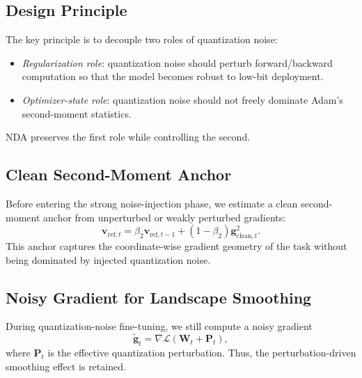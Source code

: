 \documentclass[journal]{IEEEtran}
\begin{document}
\subsection{Design Principle}
The key principle is to decouple two roles of quantization noise:
\begin{itemize}
    \item \emph{Regularization role}: quantization noise should perturb forward/backward computation so that the model becomes robust to low-bit deployment.
    \item \emph{Optimizer-state role}: quantization noise should not freely dominate Adam's second-moment statistics.
\end{itemize}
NDA preserves the first role while controlling the second.

\subsection{Clean Second-Moment Anchor}
Before entering the strong noise-injection phase, we estimate a clean second-moment anchor from unperturbed or weakly perturbed gradients:
\begin{equation}
    \boldsymbol{v}_{\mathrm{ref},t}
    =
    \beta_2
    \boldsymbol{v}_{\mathrm{ref},t-1}
    +
    (1-\beta_2)
    \boldsymbol{g}_{\mathrm{clean},t}^{2}.
\end{equation}
This anchor captures the coordinate-wise gradient geometry of the task without being dominated by injected quantization noise.

\subsection{Noisy Gradient for Landscape Smoothing}
During quantization-noise fine-tuning, we still compute a noisy gradient
\begin{equation}
    \tilde{\boldsymbol{g}}_t
    =
    \nabla
    \mathcal{L}
    (
    \boldsymbol{W}_t+\boldsymbol{P}_t
    ),
\end{equation}
where $\boldsymbol{P}_t$ is the effective quantization perturbation. Thus, the perturbation-driven smoothing effect is retained.
\end{document}
